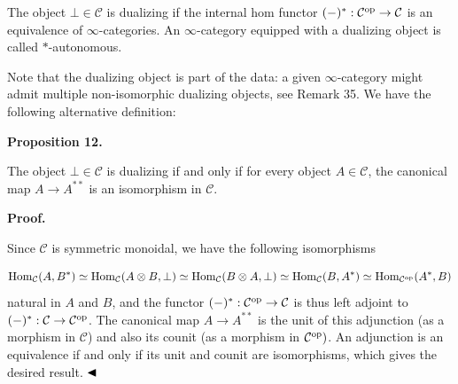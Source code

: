  
The object $\bot\in{\mathcal{C}}$ is dualizing if the internal hom functor $(-)^{*}:{\mathcal{C}}^{\textnormal{op}}\to{\mathcal{C}}$ is an equivalence of $\infty$-categories. An $\infty$-category equipped with a dualizing object is called $\ast$-autonomous.\par
 
 
 
 
Note that the dualizing object is part of the data: a given $\infty$-category might admit multiple non-isomorphic dualizing objects, see Remark 35. We have the following alternative definition:\par
 
 
 
\par\medskip\noindent\textbf{Proposition 12.}\par
 
 
The object $\bot\in{\mathcal{C}}$ is dualizing if and only if for every object $A\in{\mathcal{C}}$, the canonical map $A\to A^{**}$ is an isomorphism in ${\mathcal{C}}$.\par
 
 
 
 
\par\medskip\noindent\textbf{Proof.}\par
 
 
Since ${\mathcal{C}}$ is symmetric monoidal, we have the following isomorphisms\par
    \[\operatorname{Hom}_{\mathcal{C}}(A,B^{*})\simeq\operatorname{Hom}_{\mathcal{C}}(A\otimes B,\bot)\simeq\operatorname{Hom}_{\mathcal{C}}(B\otimes A,\bot)\simeq\operatorname{Hom}_{\mathcal{C}}(B,A^{*})\simeq\operatorname{Hom}_{{\mathcal{C}}^{\textnormal{op}}}(A^{*},B)\]    
natural in $A$ and $B$, and the functor $(-)^{*}:{\mathcal{C}}^{\textnormal{op}}\to{\mathcal{C}}$ is thus left adjoint to $(-)^{*}:{\mathcal{C}}\to{\mathcal{C}}^{\textnormal{op}}$. The canonical map $A\to A^{**}$ is the unit of this adjunction (as a morphism in ${\mathcal{C}}$) and also its counit (as a morphism in ${\mathcal{C}}^{\textnormal{op}})$. An adjunction is an equivalence if and only if its unit and counit are isomorphisms, which gives the desired result. $\hfill\blacktriangleleft$\par
 
